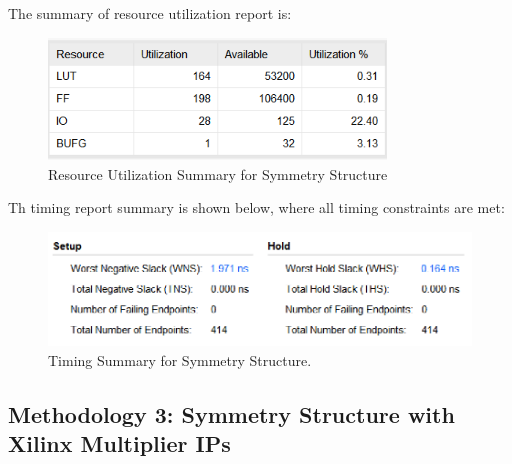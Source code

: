 \documentclass[a4paper]{article}
\begin{document}
The summary of resource utilization report is:
\begin{figure}[H]
    \centering
    \includegraphics[width=0.8\textwidth]{siyuan/Sym usage.png}
    \caption{Resource Utilization Summary for Symmetry Structure}
\end{figure}
Th timing report summary is shown below, where all timing constraints are met:
\begin{figure}[H]
    \centering
    \includegraphics[width=1\textwidth]{siyuan/Sym timing.png}
    \caption{Timing Summary for Symmetry Structure.}
\end{figure}



\subsection{Methodology 3: Symmetry Structure with Xilinx Multiplier IPs}
\end{document}

